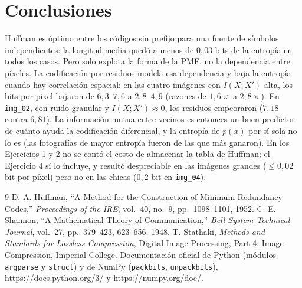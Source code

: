 \documentclass[11pt,a4paper]{article}
\begin{document}
\section{Conclusiones}
Huffman es óptimo entre los códigos sin prefijo para una fuente de símbolos independientes: la longitud media quedó a menos de $0{,}03$ bits de la entropía en todos los casos. Pero solo explota la forma de la PMF, no la dependencia entre píxeles. La codificación por residuos modela esa dependencia y baja la entropía cuando hay correlación espacial: en las cuatro imágenes con $I(X;X')$ alta, los bits por píxel bajaron de $6{,}3$--$7{,}6$ a $2{,}8$--$4{,}9$ (razones de $1{,}6\times$ a $2{,}8\times$). En \texttt{img\_02}, con ruido granular y $I(X;X')\approx 0$, los residuos empeoraron ($7{,}18$ contra $6{,}81$). La información mutua entre vecinos es entonces un buen predictor de cuánto ayuda la codificación diferencial, y la entropía de $p(x)$ por sí sola no lo es (las fotografías de mayor entropía fueron de las que más ganaron). En los Ejercicios 1 y 2 no se contó el costo de almacenar la tabla de Huffman; el Ejercicio 4 sí lo incluye, y resultó despreciable en las imágenes grandes ($\le 0{,}02$ bit por píxel) pero no en las chicas ($0{,}2$ bit en \texttt{img\_04}).

\begin{thebibliography}{9}
 D. A. Huffman, ``A Method for the Construction of Minimum-Redundancy Codes,'' \textit{Proceedings of the IRE}, vol.~40, no.~9, pp.~1098--1101, 1952.
 C. E. Shannon, ``A Mathematical Theory of Communication,'' \textit{Bell System Technical Journal}, vol.~27, pp.~379--423, 623--656, 1948.
 T. Stathaki, \textit{Methods and Standards for Lossless Compression}, Digital Image Processing, Part 4: Image Compression, Imperial College.
 Documentación oficial de Python (módulos \texttt{argparse} y \texttt{struct}) y de NumPy (\texttt{packbits}, \texttt{unpackbits}), \url{https://docs.python.org/3/} y \url{https://numpy.org/doc/}.
\end{thebibliography}
\end{document}
